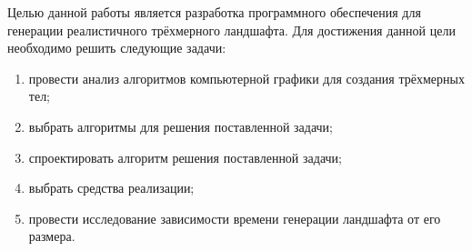 
Целью данной работы является разработка программного обеспечения для генерации реалистичного трёхмерного ландшафта. Для достижения данной цели необходимо решить следующие задачи:
\begin{enumerate}
	\item провести анализ алгоритмов компьютерной графики для создания трёхмерных тел;
	\item выбрать алгоритмы для решения поставленной задачи;
	\item спроектировать алгоритм решения поставленной задачи;
	\item выбрать средства реализации;
	\item провести исследование зависимости времени генерации ландшафта от его размера.
\end{enumerate}